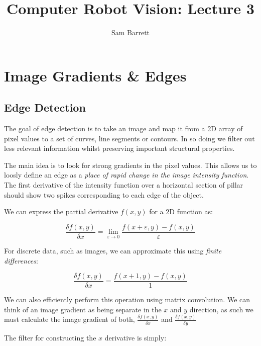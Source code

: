 \documentclass{article}
\title{Computer\/ Robot Vision: Lecture 3}
\author{Sam Barrett}
\begin{document}
\maketitle

\section{Image Gradients \& Edges}

\subsection{Edge Detection}
\label{subsec:edge detection}

The goal of edge detection is to take an image and map it from a 2D array of pixel values to a set of curves, line segments or contours. In so doing we filter out less relevant information whilst preserving important structural properties.

The main idea is to look for strong gradients in the pixel values. This allows us to loosly define an edge as a \textit{place of rapid change in the image intensity function}. The first derivative of the intensity function over a horizontal section of pillar should show two spikes corresponding to each edge of the object.

We can express the partial derivative $f(x,y)$ for a 2D function as:

\[
  \frac{\delta f(x,y)}{\delta x} = \lim_{\varepsilon \rightarrow 0} \frac{f(x+ \varepsilon, y)- f(x,y)}{\varepsilon}
\]

For discrete data, such as images, we can approximate this using \textit{finite differences}:

\[
  \frac{\delta f(x,y)}{\delta x} = \frac{f(x+1,y)-f(x,y)}{1}
\]

We can also efficiently perform this operation using matrix convolution. We can think of an image gradient as being separate in the $x$ and $y$ direction, as such we must calculate the image gradient of both, $\frac{\delta f(x,y)}{\delta x} $ and $\frac{\delta f(x,y)}{\delta y} $

The filter for constructing the $x$ derivative is simply:


\begin{center}
\end{center}
\end{document}
